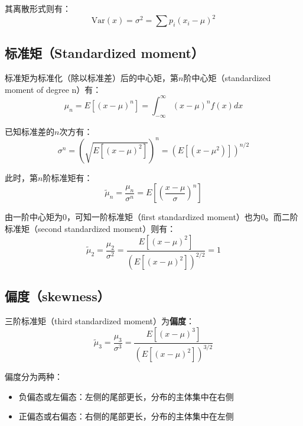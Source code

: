 \documentclass[11pt]{article}
\begin{document}
其离散形式则有：
\begin{equation*}
    \text{Var}(x) = \sigma^2 = \sum p_i (x_i - \mu)^2 
\end{equation*}

\subsection{标准矩（Standardized moment）}

标准矩为标准化（除以标准差）后的中心矩，第$n$阶中心矩（standardized moment of degree n）有：
\begin{equation*}
    \mu_n = E[(x-\mu)^n] = \int_{-\infty}^{\infty} (x-\mu)^n f(x)dx
\end{equation*}

已知标准差的$n$次方有：
\begin{equation*}
    \sigma^n = \left(\sqrt{E[(x-\mu)^2]}\right)^n = (E[(x-\mu^2)])^{n/2}
\end{equation*}

此时，第$n$阶标准矩有：
\begin{equation*}
    \tilde{\mu}_n = \frac{\mu_n}{\sigma^n} = E\left[ \left(\frac{x-\mu}{\sigma}\right)^n \right]
\end{equation*}

由一阶中心矩为$0$，可知一阶标准矩（first standardized moment）也为$0$。而二阶标准矩（second standardized moment）则有：
\begin{equation*}
    \tilde{\mu}_2 = \frac{\mu_2}{\sigma^2} = \frac{E[(x-\mu)^2]}{\left(E[(x-\mu)^2]\right)^{2/2}} = 1
\end{equation*}

\subsection*{偏度（skewness）}

三阶标准矩（third standardized moment）为\textbf{偏度}：
\begin{equation*}
    \tilde{\mu}_3 = \frac{\mu_3}{\sigma^3} = \frac{E[(x-\mu)^3]}{\left(E[(x-\mu)^2]\right)^{3/2}}
\end{equation*}

偏度分为两种：
\begin{itemize}
    \item 负偏态或左偏态：左侧的尾部更长，分布的主体集中在右侧
    \item 正偏态或右偏态：右侧的尾部更长，分布的主体集中在左侧
\end{itemize}
\end{document}
